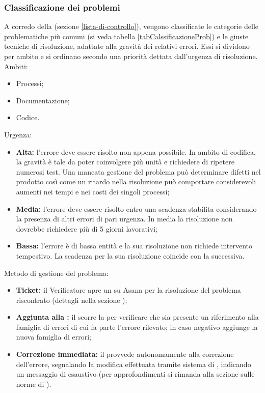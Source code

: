\documentclass[12pt,a4paper]{article}
\begin{document}
\subsubsection{Classificazione dei problemi}
A corredo della  (sezione \ref{lista-di-controllo}), vengono classificate le categorie delle problematiche più comuni (si veda tabella \ref{tabCalssificazioneProb}) e le giuste tecniche di risoluzione, adattate alla gravità dei relativi errori. Essi si dividono per ambito e si ordinano secondo una priorità dettata dall'urgenza di risoluzione. Ambiti:
\begin{itemize}
  \item Processi;
  \item Documentazione;
  \item Codice.
\end{itemize}
Urgenza:
\begin{itemize}
  \item \textbf{Alta:} l'errore deve essere risolto non appena possibile. In ambito di codifica, la gravità è tale da poter coinvolgere più unità e richiedere di ripetere numerosi test. Una mancata gestione del problema può determinare difetti nel prodotto così come un ritardo nella risoluzione può comportare considerevoli aumenti nei tempi e nei costi dei singoli processi;
  \item \textbf{Media:} l'errore deve essere risolto entro una scadenza stabilita considerando la presenza di altri errori di pari urgenza. In media la risoluzione non dovrebbe richiedere più di 5 giorni lavorativi;
  \item \textbf{Bassa:} l'errore è di bassa entità e la sua risoluzione non richiede intervento tempestivo. La scadenza per la sua risoluzione coincide con la  successiva.
\end{itemize}
Metodo di gestione del problema:
\begin{itemize}
  \item \textbf{Ticket:} il Verificatore apre un  su Asana per la risoluzione del problema riscontrato (dettagli nella sezione \TODO{});
  \item \textbf{Aggiunta alla :} il \VR{} scorre la  per verificare che sia presente un riferimento alla famiglia di errori di cui fa parte l'errore rilevato; in caso negativo aggiunge la nuova famiglia di errori;
  \item \textbf{Correzione immediata:} il \VR{} provvede autonomamente alla correzione dell'errore, segnalando la modifica effettuata tramite sistema di , indicando un messaggio di  esaustivo (per approfondimenti si rimanda alla sezione sulle norme di  \TODO{}).
\end{itemize}
\end{document}
